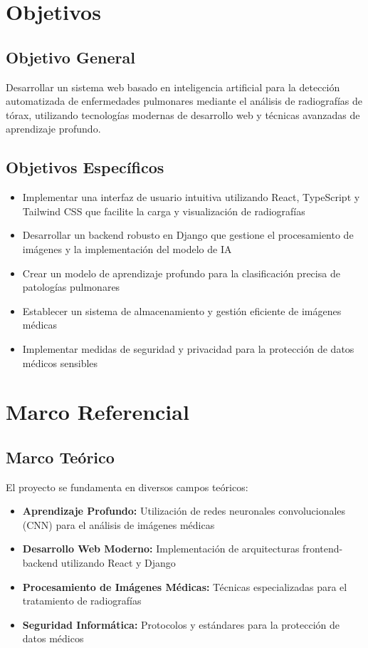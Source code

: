 \documentclass[conference]{IEEEtran}
\begin{document}
\section{Objetivos}
\subsection{Objetivo General}
Desarrollar un sistema web basado en inteligencia artificial para la detección automatizada de enfermedades pulmonares mediante el análisis de radiografías de tórax, utilizando tecnologías modernas de desarrollo web y técnicas avanzadas de aprendizaje profundo.

\subsection{Objetivos Específicos}
\begin{itemize}
    \item Implementar una interfaz de usuario intuitiva utilizando React, TypeScript y Tailwind CSS que facilite la carga y visualización de radiografías
    \item Desarrollar un backend robusto en Django que gestione el procesamiento de imágenes y la implementación del modelo de IA
    \item Crear un modelo de aprendizaje profundo para la clasificación precisa de patologías pulmonares
    \item Establecer un sistema de almacenamiento y gestión eficiente de imágenes médicas
    \item Implementar medidas de seguridad y privacidad para la protección de datos médicos sensibles
\end{itemize}

\section{Marco Referencial}
\subsection{Marco Teórico}
El proyecto se fundamenta en diversos campos teóricos:

\begin{itemize}
    \item \textbf{Aprendizaje Profundo:} Utilización de redes neuronales convolucionales (CNN) para el análisis de imágenes médicas
    \item \textbf{Desarrollo Web Moderno:} Implementación de arquitecturas frontend-backend utilizando React y Django
    \item \textbf{Procesamiento de Imágenes Médicas:} Técnicas especializadas para el tratamiento de radiografías
    \item \textbf{Seguridad Informática:} Protocolos y estándares para la protección de datos médicos
\end{itemize}
\end{document}
